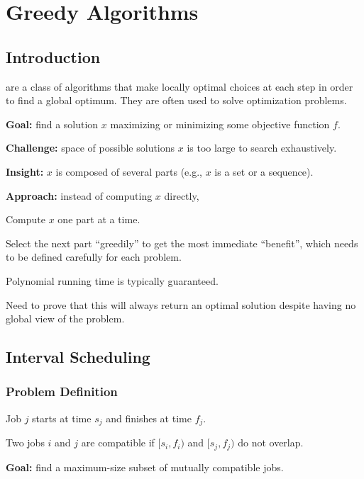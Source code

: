 \chapter{Greedy Algorithms}

\section{Introduction}

 are a class of algorithms that make locally optimal choices at each step in order to find a global optimum. They are often used to solve optimization problems.

\begin{listu}
    \item \textbf{Goal:} find a solution $x$ maximizing or minimizing some objective function $f$.
    \item \textbf{Challenge:} space of possible solutions $x$ is too large to search exhaustively.
    \item \textbf{Insight:} $x$ is composed of several parts (e.g., $x$ is a set or a sequence).
    \item \textbf{Approach:} instead of computing $x$ directly,
    \begin{listu}
        \item Compute $x$ one part at a time.
        \item Select the next part ``greedily'' to get the most immediate ``benefit'', which needs to be defined carefully for each problem.
        \item Polynomial running time is typically guaranteed.
        \item Need to prove that this will always return an optimal solution despite having no global view of the problem.
    \end{listu}
\end{listu}

\section{Interval Scheduling}\label{sec:interval-scheduling}

\subsection{Problem Definition}

\begin{listu}
    \item Job $j$ starts at time $s_j$ and finishes at time $f_j$.
    \item Two jobs $i$ and $j$ are compatible if $[s_i, f_i)$ and $[s_j, f_j)$ do not overlap.
    \item \textbf{Goal:} find a maximum-size subset of mutually compatible jobs.
\end{listu}


